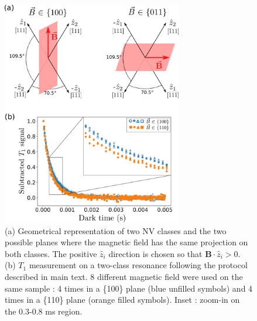 \documentclass[preprintnumbers,amsmath,amssymb,onecolumn,12pt]{revtex4-2}\usepackage{graphicx}%
\begin{document}
\begin{figure}
\includegraphics[width=0.7\textwidth]{Figures_SI/121_VS_22}
\caption{(a) Geometrical representation of two NV classes and the two possible planes where the magnetic field has the same projection on both classes. The positive $\hat z_i$ direction is chosen so that $\bm{B}\cdot \hat{z}_i >0$. (b) $T_1$ measurement on a two-class resonance following the protocol described in main text. 8 different magnetic field were used on the same sample : 4 times in a \{100\} plane (blue unfilled symbols) and 4 times in a \{110\} plane (orange filled symbols). Inset : zoom-in on the 0.3-0.8 ms region.}
\label{121 VS 22 fig}
\end{figure}
\end{document}
